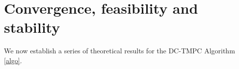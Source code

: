 \documentclass[letterpaper, 10 pt, conference]{ieeeconf}
\newtheorem{lemma}[theorem]{Lemma}
\begin{document}
\section{Convergence, feasibility and stability}
\label{sec:convergence}

We now establish a series of theoretical results for the DC-TMPC Algorithm \ref{algo}. 

\end{document}
